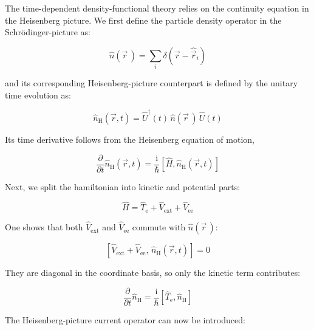 The time-dependent density-functional theory relies on the continuity equation in the Heisenberg picture.
We first define the particle density operator in the Schrödinger-picture as:

\begin{equation}
    \hat{n}(\vec{r}\,)
    = \sum_i \delta(\vec{r}-\hat{\vec{r}}_i)
\label{Schrodinger-picture_density_operator}
\end{equation}

and its corresponding Heisenberg-picture counterpart is defined by the unitary time evolution as:

\begin{equation}
    \hat{n}_\mathrm{H}(\vec{r},t)
    = \hat U^\dagger(t)\,\hat{n}(\vec{r}\,)\,\hat{U}(t)
\label{Heisenberg-picture_density_operator}
\end{equation}

Its time derivative follows from the Heisenberg equation of motion,

\begin{equation}
    \frac{\partial}{\partial t}\hat n_\mathrm{H}(\vec{r},t)
    = \frac{\mathrm{i}}{\hbar}\left[\hat{H},\hat n_\mathrm{H}(\vec{r},t)\right]
\label{density_time_derivative}
\end{equation}

Next, we split the hamiltonian into kinetic and potential parts:

\begin{equation}
    \hat{H} = \hat{T}_\mathrm{e} + \hat{V}_\mathrm{ext} + \hat{V}_\mathrm{ee}
\label{splitted_hamiltonian}
\end{equation}

One shows that both $\hat{V}_\mathrm{ext}$ and $\hat{V}_\mathrm{ee}$ commute with $\hat{n}(\vec{r}\,)$:

\begin{equation}
    \left[\hat{V}_\mathrm{ext}+\hat{V}_\mathrm{ee},\,\hat n_\mathrm{H}(\vec{r},t)\right] = 0
\label{commuting_potential_density}
\end{equation}

They are diagonal in the coordinate basis, so only the kinetic term contributes:

\begin{equation}
    \frac{\partial}{\partial t}\hat{n}_\mathrm{H}
    = \frac{\mathrm{i}}{\hbar}\left[\hat{T}_\mathrm{e},\hat{n}_\mathrm{H}\right]
\label{kinetic_term_contribution}
\end{equation}

The Heisenberg-picture current operator can now be introduced:

